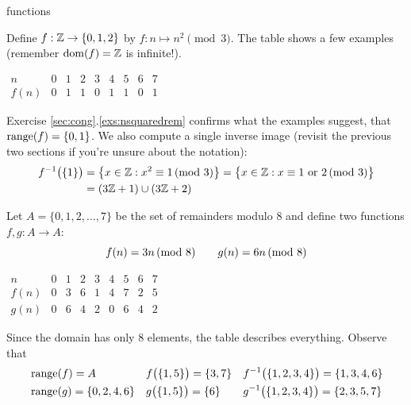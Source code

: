\begin{examples}{}{functions}
\begin{enumerate}
	\begin{minipage}[t]{0.64\linewidth}\vspace{0pt}
		\item Define $f:\mathbb{Z}\to\{0,1,2\}$ by $f:n\mapsto n^2\pmod 3$. The table shows a few examples (remember $\operatorname{dom}(f)=\mathbb{Z}$ is infinite!).
	\end{minipage}
	\hfill
	\begin{minipage}[t]{0.35\linewidth}\vspace{0pt}
		\flushright
		$\begin{array}{c|cccccccc}
  		n&0&1&2&3&4&5&6&7\\\hline
  		f(n)&0&1&1&0&1&1&0&1
  	\end{array}$
	\end{minipage}\par
		Exercise \ref*{sec:cong}.\ref{exs:nsquaredrem} confirms what the examples suggest, that $\operatorname{range}(f)=\{0,1\}$. We also compute a single inverse image (revisit the previous two sections if you're unsure about the notation):
		\begin{align*}
			f^{-1}\bigl(\{1\}\bigr) &=\bigl\{x\in\mathbb{Z}:x^2\equiv 1\negthickspace\pmod{3}\bigr\} =\bigl\{x\in\mathbb{Z}:x\equiv 1\text{ or }2\negthickspace\pmod{3}\bigr\}\\
			&=(3\mathbb{Z}+1)\cup(3\mathbb{Z}+2)
		\end{align*}

  \begin{minipage}[t]{0.64\linewidth}\vspace{0pt}
    \item\label{ex:functmod} Let $A=\{0,1,2,\ldots,7\}$ be the set of remainders modulo 8 and define two functions $f,g:A\to A$:
    \[
    	f(n)=3n\negthickspace\pmod{8}\qquad g(n)=6n\negthickspace\pmod{8}
    \]
  \end{minipage}
  \hfill
  \begin{minipage}[t]{0.35\linewidth}\vspace{0pt}
  	\flushright
  	$\begin{array}{c|cccccccccc}
  		n&0&1&2&3&4&5&6&7\\\hline
  		f(n)&0&3&6&1&4&7&2&5\\\hline
  		g(n)&0&6&4&2&0&6&4&2
  	\end{array}$	
  \end{minipage}
  \smallbreak
  Since the domain has only 8 elements, the table describes everything. Observe that
  \begin{align*}
  	&\operatorname{range}(f)=A &&f\bigl(\{1,5\}\bigr) =\{3,7\} &&f^{-1}\bigl(\{1,2,3,4\}\bigr) =\{1,3,4,6\}\\
  	&\operatorname{range}(g)=\{0,2,4,6\} &&g\bigl(\{1,5\}\bigr) =\{6\} &&g^{-1}\bigl(\{1,2,3,4\}\bigr) =\{2,3,5,7\}
  \end{align*}
  	

\end{enumerate}
\end{examples}
